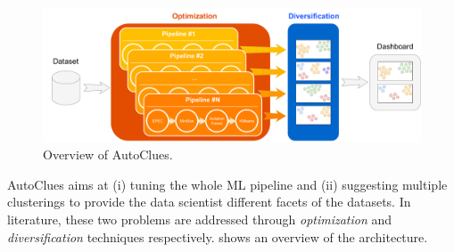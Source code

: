 
\begin{figure}[t]
    \centering
    \includegraphics[scale=.26]{chapters/data-centric/unsupervised/img/approach.pdf}
    \caption{Overview of AutoClues.}
    \label{clustering-fig:overview}
\end{figure}

AutoClues aims at (i) tuning the whole ML pipeline and (ii) suggesting multiple clusterings to provide the data scientist different facets of the datasets. 
%
In literature, these two problems are addressed through \textit{optimization} and \textit{diversification} techniques respectively.
 shows an overview of the architecture.
%

